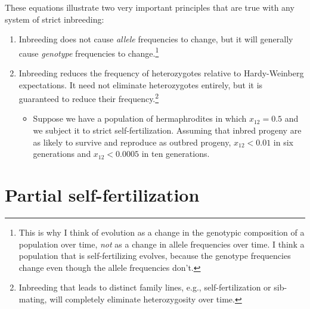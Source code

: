 These equations illustrate two very important principles that are true
with any system of strict inbreeding:

\begin{enumerate}

\item Inbreeding does not cause {\it allele\/} frequencies to change,
  but it will generally cause {\it genotype\/} frequencies to
  change.\footnote{This is why I think of evolution as a change in the
    genotypic composition of a population over time, {\it not} as a
    change in allele frequencies over time. I think a population that
    is self-fertilizing evolves, because the genotype frequencies
    change even though the allele frequencies don't.}

\item Inbreeding reduces the frequency of heterozygotes relative to
  Hardy-Weinberg expectations. It need not eliminate heterozygotes
  entirely, but it is guaranteed to reduce their
  frequency.\footnote{Inbreeding that leads to distinct family lines,
    e.g., self-fertilization or sib-mating, will completely eliminate
    heterozygosity over time.}

\begin{itemize}

\item Suppose we have a population of hermaphrodites in which $x_{12}
= 0.5$ and we subject it to strict self-fertilization. Assuming that
inbred progeny are as likely to survive and reproduce as outbred
progeny, $x_{12} < 0.01$ in six generations and $x_{12} < 0.0005$ in
ten generations.

\end{itemize}

\end{enumerate}

\section*{Partial self-fertilization}

